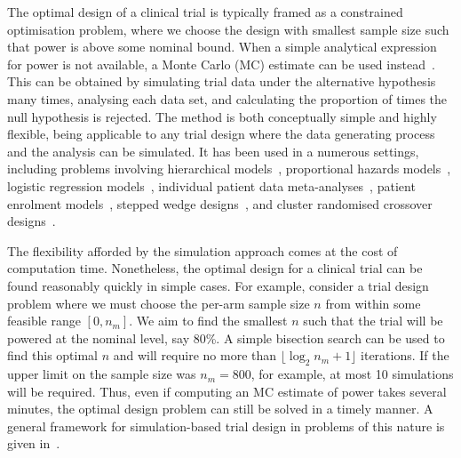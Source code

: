 \documentclass{article} %
\begin{document}


The optimal design of a clinical trial is typically framed as a constrained optimisation problem, where we choose the design with smallest sample size such that power is above some nominal bound. When a simple analytical expression for power is not available, a Monte Carlo (MC) estimate can be used instead~\cite{Arnold2011, Landau2013}. This can be obtained by simulating trial data under the alternative hypothesis many times, analysing each data set, and calculating the proportion of times the null hypothesis is rejected. The method is both conceptually simple and highly flexible, being applicable to any trial design where the data generating process and the analysis can be simulated. It has been used in a numerous settings, including problems involving hierarchical models~\cite{Feng1992, Hooper2013}, proportional hazards models~\cite{Schoenfeld2005}, logistic regression models~\cite{Grieve2016}, individual patient data meta-analyses~\cite{Sutton2007, Kontopantelis2016}, patient enrolment models~\cite{Fedorov2005}, stepped wedge designs~\cite{Baio2015, Hooper2016}, and cluster randomised crossover designs~\cite{Reich2012}. 

The flexibility afforded by the simulation approach comes at the cost of computation time. Nonetheless, the optimal design for a clinical trial can be found reasonably quickly in simple cases. For example, consider a trial design problem where we must choose the per-arm sample size $n$ from within some feasible range $[0,  n_{m}]$. We aim to find the smallest $n$ such that the trial will be powered at the nominal level, say 80\%. A simple bisection search can be used to find this optimal $n$ and will require no more than 
$\lfloor \log_{2}{n_{m}}+1 \rfloor$ iterations. If the upper limit on the sample size was $n_{m} = 800$, for example, at most 10 simulations will be required. Thus, even if computing an MC estimate of power takes several minutes, the optimal design problem can still be solved in a timely manner. A general framework for simulation-based trial design in problems of this nature is given in~\cite{Landau2013}.
\end{document}

